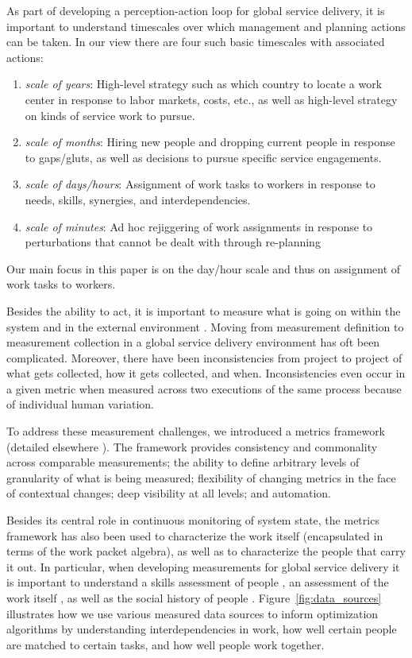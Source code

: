 \documentclass[10pt,journal,cspaper,compsoc]{IEEEtran}
\begin{document}
As part of developing a perception-action loop for global service delivery, it is important to understand 
timescales over which management and planning actions can be taken.  In our view there are four such basic 
timescales with associated actions:
\begin{enumerate}
  \item \emph{scale of years}: High-level strategy such as which country to locate a work center in response to 
	labor markets, costs, etc., as well as high-level strategy on kinds of service work to pursue.
  \item \emph{scale of months}: Hiring new people and dropping current people in response to gaps/gluts, as well 
	as decisions to pursue specific service engagements.
  \item \emph{scale of days/hours}: Assignment of work tasks to workers in response to needs, skills, synergies, 
	and interdependencies.
  \item \emph{scale of minutes}: Ad hoc rejiggering of work assignments in response to perturbations that cannot 
	be dealt with through re-planning
\end{enumerate}
Our main focus in this paper is on the day/hour scale and thus on assignment of work tasks to workers.

Besides the ability to act, it is important to measure what is going on within the system and in the external 
environment \cite{Kuhn1961}.  Moving from measurement definition to measurement collection in a global 
service delivery environment has oft been complicated.
Moreover, there have been inconsistencies from project to project of what gets collected, how it gets collected, and when.
Inconsistencies even occur in a given metric when measured across two executions of the same process
because of individual human variation.  

To address these measurement challenges, we introduced a metrics framework 
(detailed elsewhere \cite{OppenheimCV2012}). The framework provides consistency and commonality across comparable measurements; the ability to define 
arbitrary levels of granularity of what is being measured; flexibility of changing metrics in the face of contextual
changes; deep visibility at all levels; and automation.  

Besides its central role in continuous monitoring of system state, the metrics framework has also been used to 
characterize the work itself (encapsulated in terms of the work packet algebra), as well as to characterize the 
people that carry it out.  In particular, when developing measurements for global service delivery it is important 
to understand a skills assessment of people \cite{VarshneyWMFB2013}, an assessment of the work itself \cite{LiK2013}, 
as well as the social history of people \cite{LiuASL2013}.  Figure~\ref{fig:data_sources} illustrates how we use 
various measured data sources to inform optimization algorithms by understanding interdependencies in work, how well 
certain people are matched to certain tasks, and how well people work together.
\end{document}
